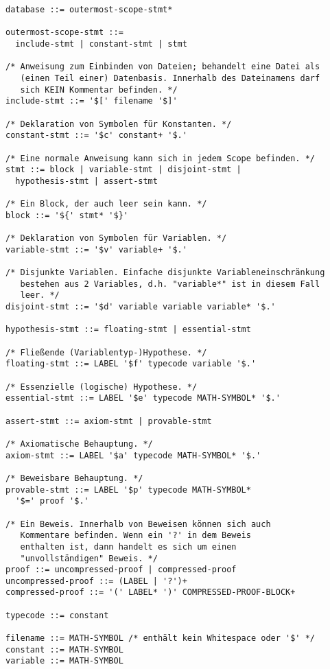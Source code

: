 \begin{verbatim}
database ::= outermost-scope-stmt*

outermost-scope-stmt ::=
  include-stmt | constant-stmt | stmt

/* Anweisung zum Einbinden von Dateien; behandelt eine Datei als
   (einen Teil einer) Datenbasis. Innerhalb des Dateinamens darf
   sich KEIN Kommentar befinden. */
include-stmt ::= '$[' filename '$]'

/* Deklaration von Symbolen für Konstanten. */
constant-stmt ::= '$c' constant+ '$.'

/* Eine normale Anweisung kann sich in jedem Scope befinden. */
stmt ::= block | variable-stmt | disjoint-stmt |
  hypothesis-stmt | assert-stmt

/* Ein Block, der auch leer sein kann. */
block ::= '${' stmt* '$}'

/* Deklaration von Symbolen für Variablen. */
variable-stmt ::= '$v' variable+ '$.'

/* Disjunkte Variablen. Einfache disjunkte Variableneinschränkung
   bestehen aus 2 Variables, d.h. "variable*" ist in diesem Fall
   leer. */
disjoint-stmt ::= '$d' variable variable variable* '$.'

hypothesis-stmt ::= floating-stmt | essential-stmt

/* Fließende (Variablentyp-)Hypothese. */
floating-stmt ::= LABEL '$f' typecode variable '$.'

/* Essenzielle (logische) Hypothese. */
essential-stmt ::= LABEL '$e' typecode MATH-SYMBOL* '$.'

assert-stmt ::= axiom-stmt | provable-stmt

/* Axiomatische Behauptung. */
axiom-stmt ::= LABEL '$a' typecode MATH-SYMBOL* '$.'

/* Beweisbare Behauptung. */
provable-stmt ::= LABEL '$p' typecode MATH-SYMBOL*
  '$=' proof '$.'

/* Ein Beweis. Innerhalb von Beweisen können sich auch
   Kommentare befinden. Wenn ein '?' in dem Beweis
   enthalten ist, dann handelt es sich um einen
   "unvollständigen" Beweis. */
proof ::= uncompressed-proof | compressed-proof
uncompressed-proof ::= (LABEL | '?')+
compressed-proof ::= '(' LABEL* ')' COMPRESSED-PROOF-BLOCK+

typecode ::= constant

filename ::= MATH-SYMBOL /* enthält kein Whitespace oder '$' */
constant ::= MATH-SYMBOL
variable ::= MATH-SYMBOL
\end{verbatim}


